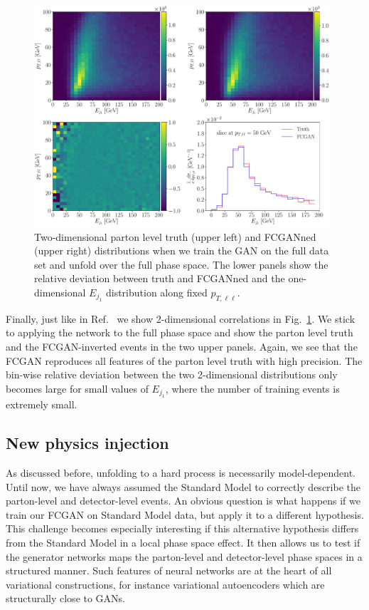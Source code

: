 \begin{figure}[t]
\centering
\includegraphics[width=0.98\textwidth]{figures/cGAN/cGAN_2d_corr}
\caption{Two-dimensional parton level truth (upper left) and FCGANned
  (upper right) distributions when we train the GAN on the full data
  set and unfold over the full phase space. The lower panels show the
  relative deviation between truth and FCGANned and the one-dimensional
  $E_{j_1}$ distribution along fixed $p_{T,\ell \ell}$.}
\label{fig:full_2d}
\end{figure}

Finally, just like in Ref.~\cite{gan_phasespace} we show 2-dimensional
correlations in Fig.~\ref{fig:full_2d}. We stick to applying the
network to the full phase space and show the parton level truth and
the FCGAN-inverted events in the two upper panels. Again, we see that
the FCGAN reproduces all features of the parton level truth with high
precision. The bin-wise relative deviation between the two 2-dimensional
distributions only becomes large for small values of $E_{j_1}$, where
the number of training events is extremely small.

\subsection{New physics injection}
\label{sec:closure}

As discussed before, unfolding to a hard process is necessarily
model-dependent. Until now, we have always assumed the Standard Model
to correctly describe the parton-level and detector-level events. 
An obvious question is what happens if we train our FCGAN on Standard
Model data, but apply it to a different hypothesis. This challenge
becomes especially interesting if this alternative hypothesis differs
from the Standard Model in a local phase space effect. It then allows
us to test if the generator networks maps the parton-level and
detector-level phase spaces in a structured manner. Such features of
neural networks are at the heart of all variational constructions, for
instance variational autoencoders which are structurally close to
GANs. 

